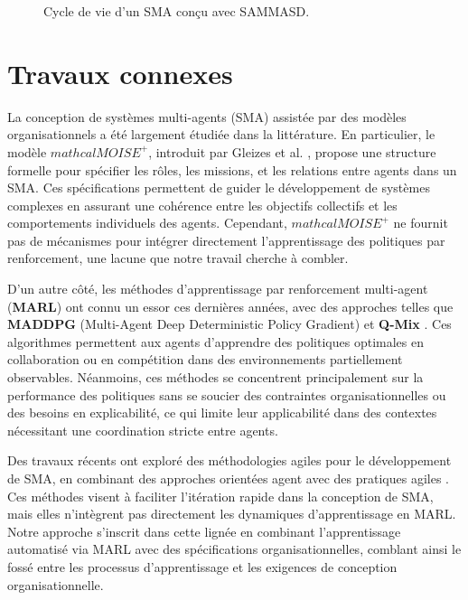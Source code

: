 \documentclass[sigconf,anonymous]{aamas}
\begin{document}
\begin{figure*}[h!]
  \centering
  
  \caption{Cycle de vie d'un SMA conçu avec SAMMASD.}
  \label{fig:cycle}
\end{figure*}

\section{Travaux connexes}
\label{sec:related_works}
La conception de systèmes multi-agents (SMA) assistée par des modèles organisationnels a été largement étudiée dans la littérature. En particulier, le modèle \textbf{$mathcal{M}OISE^+$}, introduit par Gleizes et al. \cite{gleize2008moise}, propose une structure formelle pour spécifier les rôles, les missions, et les relations entre agents dans un SMA. Ces spécifications permettent de guider le développement de systèmes complexes en assurant une cohérence entre les objectifs collectifs et les comportements individuels des agents. Cependant, $mathcal{M}OISE^+$ ne fournit pas de mécanismes pour intégrer directement l'apprentissage des politiques par renforcement, une lacune que notre travail cherche à combler.

D'un autre côté, les méthodes d'apprentissage par renforcement multi-agent (\textbf{MARL}) ont connu un essor ces dernières années, avec des approches telles que \textbf{MADDPG} (Multi-Agent Deep Deterministic Policy Gradient) \cite{lowe2017multi} et \textbf{Q-Mix} \cite{rashid2018qmix}. Ces algorithmes permettent aux agents d'apprendre des politiques optimales en collaboration ou en compétition dans des environnements partiellement observables. Néanmoins, ces méthodes se concentrent principalement sur la performance des politiques sans se soucier des contraintes organisationnelles ou des besoins en explicabilité, ce qui limite leur applicabilité dans des contextes nécessitant une coordination stricte entre agents.

Des travaux récents ont exploré des méthodologies agiles pour le développement de SMA, en combinant des approches orientées agent avec des pratiques agiles \cite{winikoff2021agile}. Ces méthodes visent à faciliter l'itération rapide dans la conception de SMA, mais elles n'intègrent pas directement les dynamiques d'apprentissage en MARL. Notre approche s'inscrit dans cette lignée en combinant l'apprentissage automatisé via MARL avec des spécifications organisationnelles, comblant ainsi le fossé entre les processus d'apprentissage et les exigences de conception organisationnelle.
\end{document}
